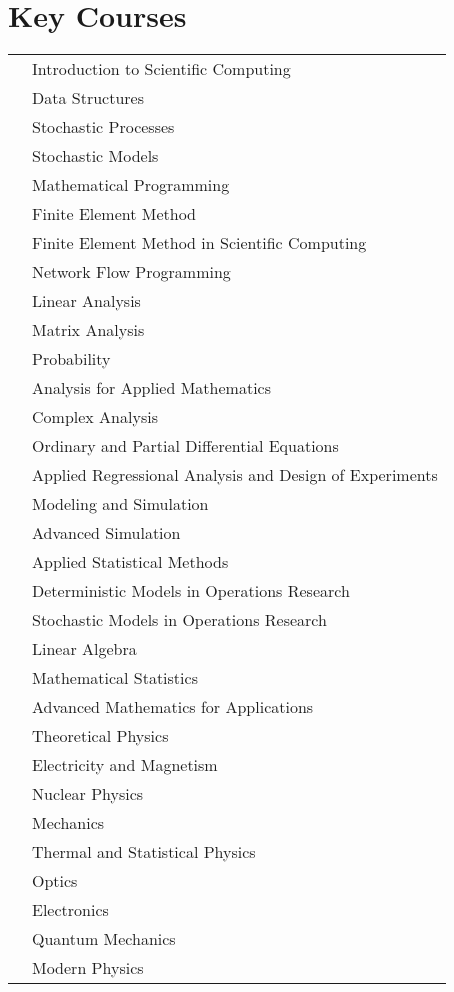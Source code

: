 \documentclass[10pt]{article}
\begin{document}
\section{Key Courses}
\begin{tabularx}{0.97\linewidth}{>{\raggedleft\scshape}p{3cm}X}
               & Introduction to Scientific Computing \\
               & Data Structures \\
               & Stochastic Processes \\
               & Stochastic Models \\
               & Mathematical Programming \\
               & Finite Element Method \\
               & Finite Element Method in Scientific Computing\\
               & Network Flow Programming \\
               & Linear Analysis \\
               & Matrix Analysis \\
               & Probability \\
               & Analysis for Applied Mathematics \\
               & Complex Analysis \\
               & Ordinary and Partial Differential Equations \\
               & Applied Regressional Analysis and Design of Experiments\\
               & Modeling and Simulation \\
               & Advanced Simulation \\
                & Applied Statistical Methods \\
               & Deterministic Models in Operations Research \\
                 & Stochastic Models in Operations Research \\
               & Linear Algebra \\
               & Mathematical Statistics \\
               & Advanced Mathematics for Applications \\
               & Theoretical Physics \\
               & Electricity and Magnetism \\
               & Nuclear Physics \\
               & Mechanics \\
               & Thermal and Statistical Physics \\
               & Optics \\
               & Electronics \\
               & Quantum Mechanics \\
               & Modern Physics \\
\end{tabularx}
\end{document}
